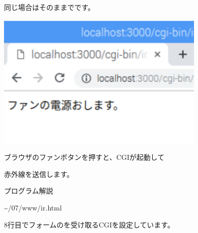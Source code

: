 同じ場合はそのままでです。

%


\centering
\includegraphics[width=10cm]{text07-img/ome7-img062.png}
\flushleft

ブラウザのファンボタンを押すと、CGIが起動して

赤外線を送信します。


\bigskip

\clearpage
プログラム解説

{\textasciitilde}/07/www/ir.html

8行目でフォームのを受け取るCGIを設定しています。


